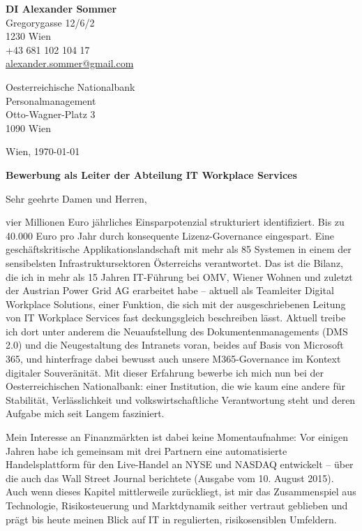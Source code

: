 \documentclass[11pt]{article}
\begin{document}
\begin{minipage}[t]{0.55\textwidth}
  \textbf{\color{accent}DI Alexander Sommer}\\
  Gregorygasse 12/6/2\\
  1230 Wien\\[4pt]
  +43 681 102 104 17\\
  \href{mailto:alexander.sommer@gmail.com}{alexander.sommer@gmail.com}
\end{minipage}\hfill
\begin{minipage}[t]{0.40\textwidth}\raggedleft
  Oesterreichische Nationalbank\\
  Personalmanagement\\
  Otto-Wagner-Platz 3\\
  1090 Wien
\end{minipage}

\vspace{10pt}
\hfill Wien, \today

\vspace{6pt}
{\bfseries\color{accent}Bewerbung als Leiter der Abteilung IT Workplace Services}

\vspace{2pt}
Sehr geehrte Damen und Herren,

vier Millionen Euro jährliches Einsparpotenzial strukturiert identifiziert. Bis zu 40.000 Euro pro Jahr durch konsequente Lizenz-Governance eingespart. Eine geschäftskritische Applikationslandschaft mit mehr als 85 Systemen in einem der sensibelsten Infrastruktursektoren Österreichs verantwortet. Das ist die Bilanz, die ich in mehr als 15 Jahren IT-Führung bei OMV, Wiener Wohnen und zuletzt der Austrian Power Grid AG erarbeitet habe -- aktuell als Teamleiter Digital Workplace Solutions, einer Funktion, die sich mit der ausgeschriebenen Leitung von IT Workplace Services fast deckungsgleich beschreiben lässt. Aktuell treibe ich dort unter anderem die Neuaufstellung des Dokumentenmanagements (DMS\,2.0) und die Neugestaltung des Intranets voran, beides auf Basis von Microsoft\,365, und hinterfrage dabei bewusst auch unsere M365-Governance im Kontext digitaler Souveränität. Mit dieser Erfahrung bewerbe ich mich nun bei der Oesterreichischen Nationalbank: einer Institution, die wie kaum eine andere für Stabilität, Verlässlichkeit und volkswirtschaftliche Verantwortung steht und deren Aufgabe mich seit Langem fasziniert.

Mein Interesse an Finanzmärkten ist dabei keine Momentaufnahme: Vor einigen Jahren habe ich gemeinsam mit drei Partnern eine automatisierte Handelsplattform für den Live-Handel an NYSE und NASDAQ entwickelt -- über die auch das Wall Street Journal berichtete (Ausgabe vom 10. August 2015). Auch wenn dieses Kapitel mittlerweile zurückliegt, ist mir das Zusammenspiel aus Technologie, Risikosteuerung und Marktdynamik seither vertraut geblieben und prägt bis heute meinen Blick auf IT in regulierten, risikosensiblen Umfeldern.
\end{document}
